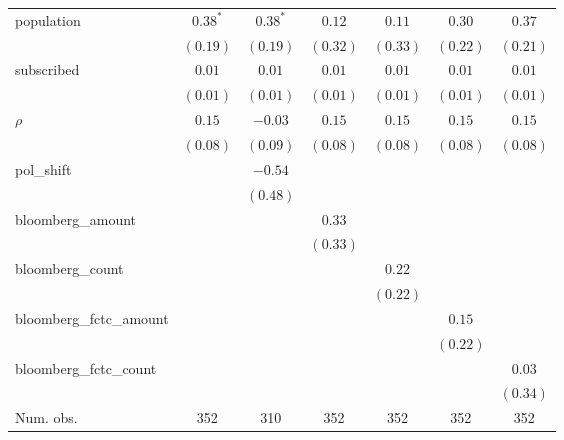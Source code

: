 \begin{table}[!h]
\begin{center}
\begin{tabular}{l c c c c c c }
population              & $0.38^{*}$   & $0.38^{*}$   & $0.12$       & $0.11$       & $0.30$       & $0.37$       \\
                        & $(0.19)$     & $(0.19)$     & $(0.32)$     & $(0.33)$     & $(0.22)$     & $(0.21)$     \\
subscribed              & $0.01$       & $0.01$       & $0.01$       & $0.01$       & $0.01$       & $0.01$       \\
                        & $(0.01)$     & $(0.01)$     & $(0.01)$     & $(0.01)$     & $(0.01)$     & $(0.01)$     \\
$\rho$                  & $0.15$       & $-0.03$      & $0.15$       & $0.15$       & $0.15$       & $0.15$       \\
                        & $(0.08)$     & $(0.09)$     & $(0.08)$     & $(0.08)$     & $(0.08)$     & $(0.08)$     \\
pol\_shift              &              & $-0.54$      &              &              &              &              \\
                        &              & $(0.48)$     &              &              &              &              \\
bloomberg\_amount       &              &              & $0.33$       &              &              &              \\
                        &              &              & $(0.33)$     &              &              &              \\
bloomberg\_count        &              &              &              & $0.22$       &              &              \\
                        &              &              &              & $(0.22)$     &              &              \\
bloomberg\_fctc\_amount &              &              &              &              & $0.15$       &              \\
                        &              &              &              &              & $(0.22)$     &              \\
bloomberg\_fctc\_count  &              &              &              &              &              & $0.03$       \\
                        &              &              &              &              &              & $(0.34)$     \\
\midrule
Num. obs.               & 352          & 310          & 352          & 352          & 352          & 352          \\

\end{tabular}
\end{center}
\end{table}
